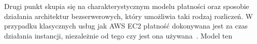 Drugi punkt skupia się na charakterystycznym modelu płatności oraz sposobie działania architektur bezserwerowych, który umożliwia taki rodzaj rozliczeń. W przypadku klasycznych usług jak AWS EC2 płatność dokonywana jest za czas działania instancji, niezależnie od tego czy jest ona używana~\cite{awsEc2Guide}. Model ten 


